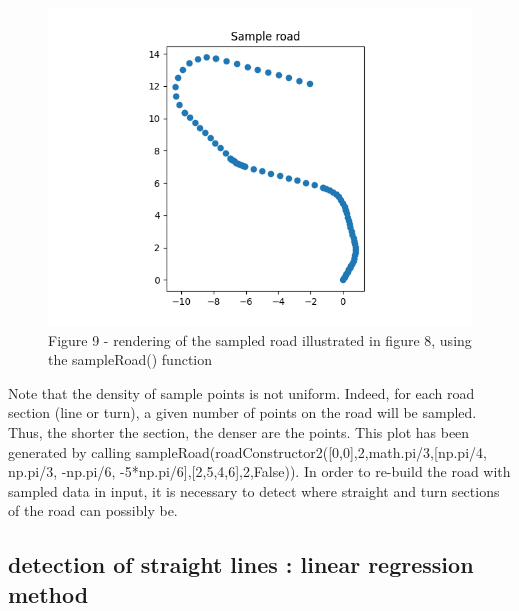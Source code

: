 \documentclass[a4paper,12pt,fleqn]{article}
\begin{document}
\begin{figure}[H]
\centering
\includegraphics[width=\textwidth]{sampledRoadPoints}
Figure 9 - rendering of the sampled road illustrated in figure 8, using the sampleRoad() function
\end{figure}
Note that the density of sample points is not uniform. Indeed, for each road section (line or turn), a given number of points on the road will be sampled. Thus, the shorter the section, the denser are the points. This plot has been generated by calling 
\newline
sampleRoad(roadConstructor2([0,0],2,math.pi/3,[np.pi/4, np.pi/3, -np.pi/6, -5*np.pi/6],[2,5,4,6],2,False)).
\newline
\newline
In order to re-build the road with sampled data in input, it is necessary to detect where straight and turn sections of the road can possibly be.

\subsection{detection of straight lines : linear regression method}
\end{document}
